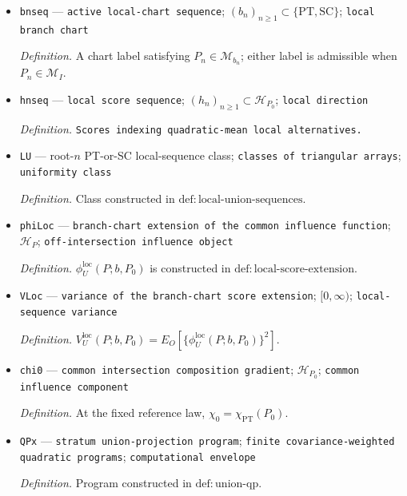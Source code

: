 \documentclass{article}
\begin{document}
\begin{itemize}
  \par\smallskip\noindent\emph{Definition.} Sequence of laws in the PT-or-SC union approaching \(P_0\) at the root-\(n\) scale.
  \item \texttt{bnseq} --- \texttt{active local-\allowbreak{}chart sequence}; \((b_n)_{n\ge1}\subset\{\mathrm{PT},\mathrm{SC}\}\); \texttt{local branch chart}
  \par\smallskip\noindent\emph{Definition.} A chart label satisfying \(P_n\in\mathcal M_{b_n}\); either label is admissible when \(P_n\in\mathcal M_I\).
  \item \texttt{hnseq} --- \texttt{local score sequence}; \((h_n)_{n\ge1}\subset\mathcal H_{P_0}\); \texttt{local direction}
  \par\smallskip\noindent\emph{Definition.} \texttt{Scores indexing quadratic-\allowbreak{}mean local alternatives.}
  \item \texttt{LU} --- root-\(n\) PT-or-SC local-sequence class; \texttt{classes of triangular arrays}; \texttt{uniformity class}
  \par\smallskip\noindent\emph{Definition.} Class constructed in \(\mathrm{def{:}local\text{-}union\text{-}sequences}\).
  \item \texttt{phiLoc} --- \texttt{branch-\allowbreak{}chart extension of the common influence function}; \(\mathcal H_P\); \texttt{off-\allowbreak{}intersection influence object}
  \par\smallskip\noindent\emph{Definition.} \(\phi_U^{\mathrm{loc}}(P;b,P_0)\) is constructed in \(\mathrm{def{:}local\text{-}score\text{-}extension}\).
  \item \texttt{VLoc} --- \texttt{variance of the branch-\allowbreak{}chart score extension}; \([0,\infty)\); \texttt{local-\allowbreak{}sequence variance}
  \par\smallskip\noindent\emph{Definition.} \(V_U^{\mathrm{loc}}(P;b,P_0)=E_O[\{\phi_U^{\mathrm{loc}}(P;b,P_0)\}^2]\).
  \item \texttt{chi0} --- \texttt{common intersection composition gradient}; \(\mathcal H_{P_0}\); \texttt{common influence component}
  \par\smallskip\noindent\emph{Definition.} At the fixed reference law, \(\chi_0=\chi_{\mathrm{PT}}(P_0)\).
  \item \texttt{QPx} --- \texttt{stratum union-\allowbreak{}projection program}; \texttt{finite covariance-\allowbreak{}weighted quadratic programs}; \texttt{computational envelope}
  \par\smallskip\noindent\emph{Definition.} Program constructed in \(\mathrm{def{:}union\text{-}qp}\).

\end{itemize}
\end{document}
